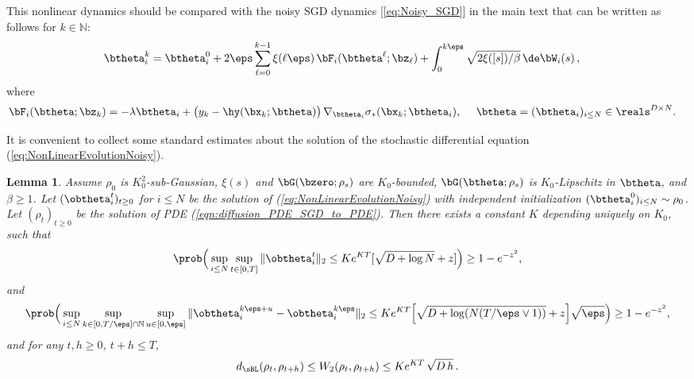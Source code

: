\documentclass[11pt]{article}
\newtheorem{lemma}{Lemma}
\begin{document}
This nonlinear dynamics should be compared with the noisy SGD dynamics [\ref{eq:Noisy_SGD}] in the main text that can be written as follows for $k \in \mathbb N$:
%
\begin{align}
%
\btheta^k_i &=\btheta^0_i+2\eps\sum_{\ell=0}^{k-1}\xi(\ell\eps)\, \bF_i(\btheta^{\ell};\bz_{\ell}) + \int_0^{k \eps} \sqrt{2\xi([s]) / \beta}\, \de \bW_i(s)\,,\label{eq:SGD_Noisy}
%
\end{align}
where 
\begin{align}
%
\bF_i(\btheta;\bz_k) &= - \lambda \btheta_i +  \big(y_k - \hy(\bx_k;\btheta)\big)\,\nabla_{\btheta_i}\sigma_*(\bx_k; \btheta_i),~~~~ \btheta = (\btheta_i)_{i \le N} \in \reals^{D \times N}. 
\end{align}


It is convenient to collect some standard estimates about the solution of the stochastic differential equation (\ref{eq:NonLinearEvolutionNoisy}).

\begin{lemma}\label{lem:SDE_norm_bound}
Assume $\rho_0$ is $K_0^2$-sub-Gaussian, $\xi(s)$ and $\bG(\bzero; \rho_s)$ are $K_0$-bounded, $\bG(\btheta; \rho_s)$ is $K_0$-Lipschitz in $\btheta$, and $\beta \ge 1$. Let $(\obtheta_i^t)_{t \ge 0}$ for $i \le N$ be the solution of (\ref{eq:NonLinearEvolutionNoisy}) with independent initialization $(\btheta_i^0)_{i \le N} \sim \rho_0$. Let $(\rho_t)_{t \ge 0}$ be the solution of PDE (\ref{eqn:diffusion_PDE_SGD_to_PDE}). Then there exists a constant $K$ depending uniquely on $K_0$, such that
\begin{equation}\label{eq:BoundNormSDE_probability}
\prob\Big( \sup_{i \le N} \sup_{t \in [0, T]} \|\obtheta_i^t\|_2\le K e^{KT}  [\sqrt{D + \log N} + z] \Big)  \ge 1 - e^{-z^2},
\end{equation}
and 
\begin{equation}\label{eqn:SDE_difference_bound}
\prob\Big(\sup_{i \le N} \sup_{k \in [0, T/\eps] \cap \mathbb N}\sup_{u\in [0, \eps]}\| \obtheta_i^{k\eps + u} - \obtheta_i^{k\eps}\|_2 \le K e^{KT} \Big[\sqrt{D + \log (N(T/\eps \vee 1))} + z\Big] \sqrt{\eps} \Big) \ge 1 - e^{-z^2}, 
\end{equation}
and for any $t,h\ge 0$, $t + h \le T$, 
\begin{equation}\label{eq:BoundDist_FiniteT}
 d_{\sBL}(\rho_t,\rho_{t+h})\le W_2(\rho_t,\rho_{t+h})\le K e^{KT}\, \sqrt{D\, h}\, .
\end{equation}


%

\end{lemma}
\end{document}
